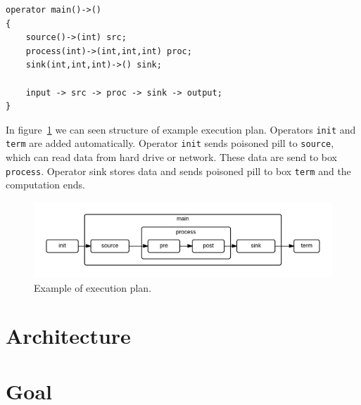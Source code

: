 \begin{verbatim}
operator main()->()
{
    source()->(int) src;
    process(int)->(int,int,int) proc;
    sink(int,int,int)->() sink;

    input -> src -> proc -> sink -> output;
}
\end{verbatim}
 In figure~\ref{fig:exampleplan} we can seen structure of example execution plan. Operators \verb|init| and \verb|term| are added automatically. Operator \verb|init| sends poisoned pill to \verb|source|, which can read data from hard drive or network. These data are send to box \verb|process|. Operator sink stores data and sends poisoned pill to box \verb|term| and the computation ends.
\begin{figure}[h!]
  \centering

    \includegraphics[width=1\textwidth]{exampleplan}
    
      \caption{Example of execution plan.}
        \label{fig:exampleplan}
\end{figure}


\section{Architecture}

\section{Goal}